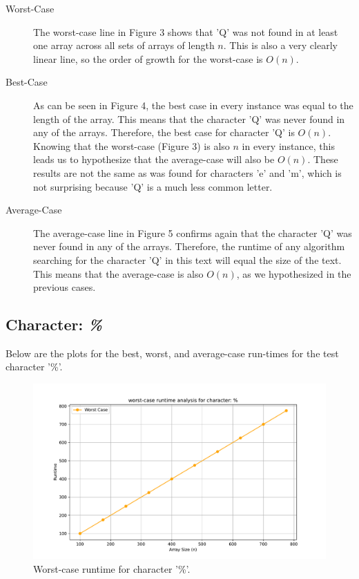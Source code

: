 \documentclass{article}
\begin{document}
\begin{description}
    \item[Worst-Case] The worst-case line in Figure 3 shows that 'Q' was not found in at least one array across all sets of arrays of length $n$. This is also a very clearly linear line, so the order of growth for the worst-case is $O(n)$.
    \item[Best-Case] As can be seen in Figure 4, the best case in every instance was equal to the length of the array. This means that the character 'Q' was never found in any of the arrays. Therefore, the best case for character 'Q' is $O(n)$. Knowing that the worst-case (Figure 3) is also $n$ in every instance, this leads us to hypothesize that the average-case will also be $O(n)$. These results are not the same as was found for characters 'e' and 'm', which is not surprising because 'Q' is a much less common letter. 
    \item[Average-Case] The average-case line in Figure 5 confirms again that the character 'Q' was never found in any of the arrays. Therefore, the runtime of any algorithm searching for the character 'Q' in this text will equal the size of the text. This means that the average-case is also $O(n)$, as we hypothesized in the previous cases. 
\end{description}

\subsection{Character: \textit{\%}}
Below are the plots for the best, worst, and average-case run-times for the test character '\%'.

	\begin{figure}[H]
		\centering
		\includegraphics[width=\textwidth]{runtime_analysis_worst_pcnt.pdf}
		\caption{Worst-case runtime for character '\%'.}
	\end{figure}
\end{document}
